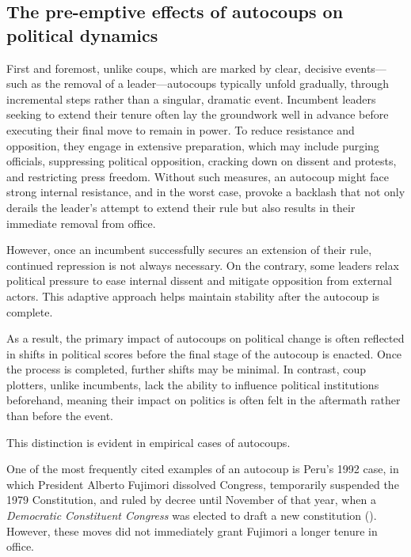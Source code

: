 \documentclass[
  12pt,
]{report}
\begin{document}
\subsection{\texorpdfstring{\textbf{The pre-emptive effects of autocoups
on political
dynamics}}{The pre-emptive effects of autocoups on political dynamics}}\label{the-pre-emptive-effects-of-autocoups-on-political-dynamics}

First and foremost, unlike coups, which are marked by clear, decisive
events---such as the removal of a leader---autocoups typically unfold
gradually, through incremental steps rather than a singular, dramatic
event. Incumbent leaders seeking to extend their tenure often lay the
groundwork well in advance before executing their final move to remain
in power. To reduce resistance and opposition, they engage in extensive
preparation, which may include purging officials, suppressing political
opposition, cracking down on dissent and protests, and restricting press
freedom. Without such measures, an autocoup might face strong internal
resistance, and in the worst case, provoke a backlash that not only
derails the leader's attempt to extend their rule but also results in
their immediate removal from office.

However, once an incumbent successfully secures an extension of their
rule, continued repression is not always necessary. On the contrary,
some leaders relax political pressure to ease internal dissent and
mitigate opposition from external actors. This adaptive approach helps
maintain stability after the autocoup is complete.

As a result, the primary impact of autocoups on political change is
often reflected in shifts in political scores before the final stage of
the autocoup is enacted. Once the process is completed, further shifts
may be minimal. In contrast, coup plotters, unlike incumbents, lack the
ability to influence political institutions beforehand, meaning their
impact on politics is often felt in the aftermath rather than before the
event.

This distinction is evident in empirical cases of autocoups.

One of the most frequently cited examples of an autocoup is Peru's 1992
case, in which President Alberto Fujimori dissolved Congress,
temporarily suspended the 1979 Constitution, and ruled by decree until
November of that year, when a \emph{Democratic Constituent Congress} was
elected to draft a new constitution (). However, these moves did not immediately grant
Fujimori a longer tenure in office.
\end{document}
